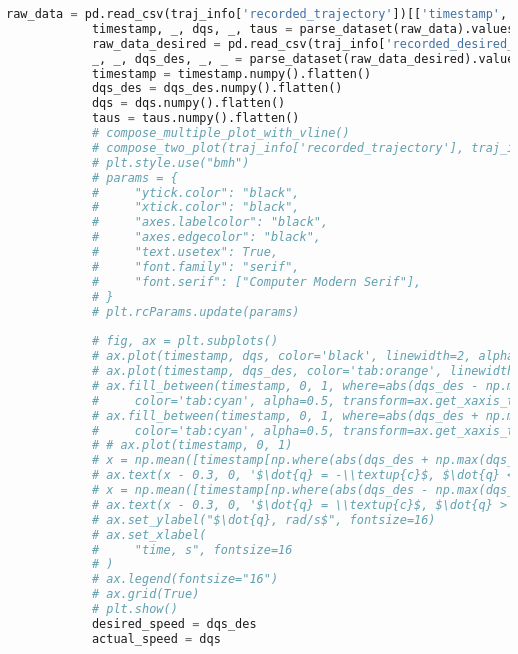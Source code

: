 \begin{lstlisting}[language=python, caption=\raggedright{identification/friction.py}, frame=single]
            raw_data = pd.read_csv(traj_info['recorded_trajectory'])[['timestamp', f'q_{i}', f'dq_{i}', f'ddq_{i}', f'tau_{i}']]
            timestamp, _, dqs, _, taus = parse_dataset(raw_data).values()
            raw_data_desired = pd.read_csv(traj_info['recorded_desired_trajectory'])[['timestamp', f'q_{i}', f'dq_{i}', f'ddq_{i}', f'tau_{i}']]
            _, _, dqs_des, _, _ = parse_dataset(raw_data_desired).values()
            timestamp = timestamp.numpy().flatten()
            dqs_des = dqs_des.numpy().flatten()
            dqs = dqs.numpy().flatten()
            taus = taus.numpy().flatten()
            # compose_multiple_plot_with_vline()
            # compose_two_plot(traj_info['recorded_trajectory'], traj_info['recorded_desired_trajectory'], ["dq"])
            # plt.style.use("bmh")
            # params = {
            #     "ytick.color": "black",
            #     "xtick.color": "black",
            #     "axes.labelcolor": "black",
            #     "axes.edgecolor": "black",
            #     "text.usetex": True,
            #     "font.family": "serif",
            #     "font.serif": ["Computer Modern Serif"],
            # }
            # plt.rcParams.update(params)
           
            # fig, ax = plt.subplots()
            # ax.plot(timestamp, dqs, color='black', linewidth=2, alpha=0.8, label='$\dot{q}$')
            # ax.plot(timestamp, dqs_des, color='tab:orange', linewidth=2, alpha=0.9, label='$\dot{q}_{des}$')
            # ax.fill_between(timestamp, 0, 1, where=abs(dqs_des - np.max(dqs_des)) < 0.001,
            #     color='tab:cyan', alpha=0.5, transform=ax.get_xaxis_transform(), linestyles='--', edgecolors='black', linewidth=2)
            # ax.fill_between(timestamp, 0, 1, where=abs(dqs_des + np.max(dqs_des)) < 0.001,
            #     color='tab:cyan', alpha=0.5, transform=ax.get_xaxis_transform(), linestyles='--', edgecolors='black', linewidth=2)
            # # ax.plot(timestamp, 0, 1)
            # x = np.mean([timestamp[np.where(abs(dqs_des + np.max(dqs_des)) < 0.001)[0]], timestamp[np.where(abs(dqs_des + np.max(dqs_des)) < 0.001)[-1]]])
            # ax.text(x - 0.3, 0, '$\dot{q} = -\\textup{c}$, $\dot{q} < 0$', fontsize=20, ma='center')
            # x = np.mean([timestamp[np.where(abs(dqs_des - np.max(dqs_des)) < 0.001)[0]], timestamp[np.where(abs(dqs_des - np.max(dqs_des)) < 0.001)[-1]]])
            # ax.text(x - 0.3, 0, '$\dot{q} = \\textup{c}$, $\dot{q} > 0$', fontsize=20, ma='center')
            # ax.set_ylabel("$\dot{q}, rad/s$", fontsize=16)
            # ax.set_xlabel(
            #     "time, s", fontsize=16
            # )
            # ax.legend(fontsize="16")
            # ax.grid(True)
            # plt.show()
            desired_speed = dqs_des 
            actual_speed = dqs 


\end{lstlisting}
